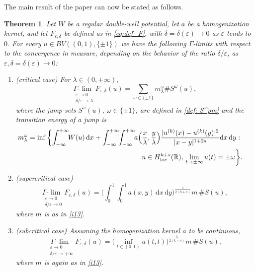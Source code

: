 \documentclass{article}
\newtheorem{Theorem}{Theorem}[section]
\theoremstyle{definition}
\newcommand{\de}{\mathrm{d}}
\newcommand{\e}{\varepsilon}
\newcommand{\del}{\delta}
\def\e{\varepsilon}
\newcommand{\Glim}{\Gamma\textrm{-}\lim\;}
\begin{document}
The main result of the paper can now be stated as follows.
\begin{Theorem}
\label{thm: result}
Let $W$ be a regular double-well potential, let $a$ be a homogenization kernel, and let $F_{\e,\delta}$ be defined as in \eqref{eq:def_F}, with $\delta = \delta(\e)\to 0$ as $\e$ tends to $0$. 
For every $u\in BV((0,1),\{\pm 1\})$  we have the following $\Gamma$-limits with respect to the convergence in measure, depending on the behavior of the ratio $\delta/\e$, as $\e, \delta=\delta(\e) \to 0$:
    \begin{enumerate}
        \item {\em (critical case)} For $\lambda \in (0,+\infty)$,
        \begin{equation}\label{result: case 1}
            \underset{\substack{\e\to 0 \\ \del/\e\to \lambda}}{\Glim}F_{\e,\del}(u)=\sum_{\omega\in\{\pm 1\}} m^\omega_\lambda \# S^\omega(u),
        \end{equation}
        where the jump-sets $S^\omega(u)$, $\omega\in \{\pm 1\}$, are defined  in \eqref{def: S^pm} and the \emph{transition energy} of a jump is
\begin{eqnarray*}\nonumber
&&\hskip-1.1cm m^{\omega}_\lambda= \inf\bigg\{\!\int_{-\infty}^{+\infty}\mkern-6muW(u)\,\de x+\int_{-\infty}^{+\infty}\mkern-6mu\int_{-\infty}^{+\infty}\mkern-6mu a\Big(\frac x\lambda,\frac y\lambda\Big)\frac{|u^{(k)}(x)-u^{(k)}(y)|^2}{|x-y|^{1+2s}}\de x\,\de y\,\colon\\
&&\hskip5.4cm u\in H^{k+s}_{\mathrm{loc}}(\mathbb R), \,\lim_{t\to \pm \infty} u(t)=\pm \omega
\bigg\}.\nonumber
\end{eqnarray*}

        \item {\em (supercritical case)}
        \begin{equation}
        \label{result: case 2}
            \underset{\substack{\e\to 0 \\ \del/\e\to 0}}{\Glim}F_{\e,\del}(u)=\Big(\int_0^1\int_0^1 a(x,y)\,\de x\,\de y\Big)^\frac{1}{2(k+s)}m\,\# S(u),
        \end{equation}
        where $m$ is as in \eqref{i13}.
        
        \item  {\em (subcritical case)} Assuming the homogenization kernel $a$ to be continuous,
        \begin{equation}
        \label{result: case 3}
              \underset{\substack{\e\to 0 \\ \del/\e\to +\infty}}{\Glim}F_{\e,\del}(u)= \Big(\inf_{t\in(0,1)} a(t,t)\Big)^\frac{1}{2(k+s)}m\, \#S(u),
        \end{equation}
        where $m$ is again as in \eqref{i13}.
    \end{enumerate}
\end{Theorem}
\end{document}
